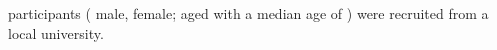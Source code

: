  participants ( male,  female; aged  with a median age of ) were recruited from a local university. 

